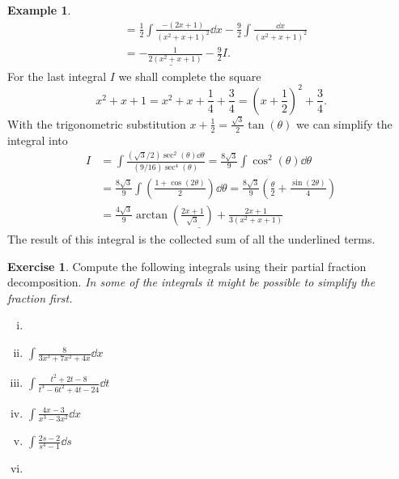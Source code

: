 \documentclass[12pt]{article}
\theoremstyle{plain}
\theoremstyle{definition}
\newtheorem{Ex}[Th]{Example}           %
\newtheorem{Ej}[Th]{Exercise}         %
\theoremstyle{remark}
\newcommand{\te}{\theta}                %
\renewcommand{\:}{\colon}           %
\newcommand{\un}[1]{\underline{#1}}
\renewcommand{\.}{\Cdot}                %
\begin{document}
\begin{multicols}{2}
\begin{Ex}
\begin{align*}
  &=\frac{1}{2}\int\frac{-(2x+1)}{(x^2+x+1)^2}\dd x-\frac{9}{2}\int\frac{\dd x}{(x^2+x+1)^2}\\
  &=\un{-\frac{1}{2(x^2+x+1)}}-\frac{9}{2}I.
 \end{align*}
 \vspace*{0.2em}
 For the last integral $I$ we shall complete the square
 $$x^2+x+1=x^2+x+\frac{1}{4}+\frac{3}{4}=\left(x+\frac{1}{2}\right)^2+\frac{3}{4}.$$
 With the trigonometric substitution $x+\frac{1}{2}=\frac{\sqrt{3}}{2}\tan(\te)$ we can simplify the integral into  \begin{align*}
  I&=\int\frac{(\sqrt{3}/2)\sec^2(\te)\dd\te}{(9/16)\sec^4(\te)}=\frac{8\sqrt{3}}{9}\int\cos^2(\te)\dd\te\\
  &=\frac{8\sqrt{3}}{9}\int\left(\frac{1+\cos(2\te)}{2}\right)\dd\te=\frac{8\sqrt{3}}{9}\left(\frac{\te}{2}+\frac{\sin(2\te)}{4}\right)\\
  &=\un{\frac{4\sqrt{3}}{9}\arctan\left(\frac{2x+1}{\sqrt{3}}\right)+\frac{2x+1}{3(x^2+x+1)}}
 \end{align*}
 The result of this integral is the collected sum of all the underlined terms.
\end{Ex}
\begin{Ej}
Compute the following integrals using their partial fraction decomposition. \emph{In some of the integrals it might be possible to simplify the fraction first.}
\vspace*{-0.4em}
\begin{multicols*}{2}
  \begin{enumerate}[i)]
    \itemsep=-0.2em
    \item {}
    \item $\displaystyle\int\frac{8}{{3x^3+7x^2+4x}}\dd x$
    \item $\displaystyle\int\frac{t^2+2t-8}{t^3-6t^2+4t-24}\dd t$
    \item $\displaystyle\int\frac{4x-3}{{x^3-3x^2}}\dd x$
    \item $\displaystyle\int\frac{2s-2}{s^4-1}\dd s$
    \item {}
  \end{enumerate}
\end{multicols*}

\end{Ej}
\end{multicols}
\end{document}
